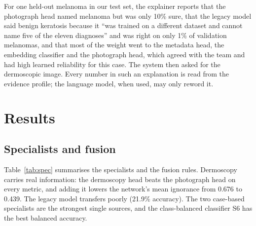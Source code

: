 \documentclass[conference]{IEEEtran}
\begin{document}
For one held-out melanoma in our test set, the explainer reports that the photograph head named melanoma but was only 10\% sure, that the legacy model said benign keratosis because it ``was trained on a different dataset and cannot name five of the eleven diagnoses'' and was right on only 1\% of validation melanomas, and that most of the weight went to the metadata head, the embedding classifier and the photograph head, which agreed with the team and had high learned reliability for this case. The system then asked for the dermoscopic image. Every number in such an explanation is read from the evidence profile; the language model, when used, may only reword it.

\section{Results}
\label{sec:results}
\subsection{Specialists and fusion}
Table~\ref{tab:spec} summarises the specialists and the fusion rules. Dermoscopy carries real information: the dermoscopy head beats the photograph head on every metric, and adding it lowers the network's mean ignorance from 0.676 to 0.439. The legacy model transfers poorly (21.9\% accuracy). The two case-based specialists are the strongest single sources, and the class-balanced classifier S6 has the best balanced accuracy.
\end{document}
